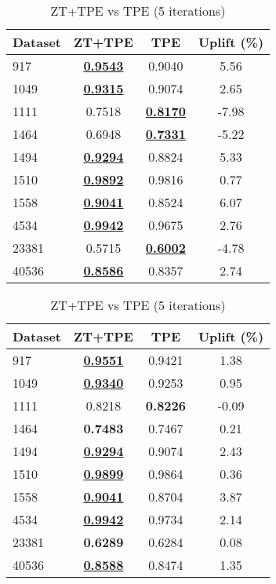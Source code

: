 \begin{table}[htbp]
\begin{center}
\begin{small}
\begin{sc}
\begin{subtable}[t]{0.48\textwidth}
    \centering
    \caption{ZT+TPE vs TPE (1 iteration)}
    \label{tab:randomforest-optuna-1}
    \begin{tabular}{lccc}
    \toprule
    \textbf{Dataset} & \textbf{ZT+TPE} & \textbf{TPE} & \textbf{Uplift (\%)} \\
    \midrule
    917    & \underline{\textbf{0.9543}} & 0.9040 & 5.56 \\
    1049    & \underline{\textbf{0.9315}} & 0.9074 & 2.65 \\
    1111    & 0.7518 & \underline{\textbf{0.8170}} & -7.98 \\
    1464    & 0.6948 & \underline{\textbf{0.7331}} & -5.22 \\
    1494    & \underline{\textbf{0.9294}} & 0.8824 & 5.33 \\
    1510    & \underline{\textbf{0.9892}} & 0.9816 & 0.77 \\
    1558    & \underline{\textbf{0.9041}} & 0.8524 & 6.07 \\
    4534    & \underline{\textbf{0.9942}} & 0.9675 & 2.76 \\
    23381    & 0.5715 & \underline{\textbf{0.6002}} & -4.78 \\
    40536    & \underline{\textbf{0.8586}} & 0.8357 & 2.74 \\
    \bottomrule
    \end{tabular}
\end{subtable}
\hfill
\begin{subtable}[t]{0.48\textwidth}
    \centering
    \caption{ZT+TPE vs TPE (5 iterations)}
    \label{tab:randomforest-optuna-5}
    \begin{tabular}{lccc}
    \toprule
    \textbf{Dataset} & \textbf{ZT+TPE} & \textbf{TPE} & \textbf{Uplift (\%)} \\
    \midrule
    917    & \underline{\textbf{0.9551}} & 0.9421 & 1.38 \\
    1049    & \underline{\textbf{0.9340}} & 0.9253 & 0.95 \\
    1111    & 0.8218 & \textbf{0.8226} & -0.09 \\
    1464    & \textbf{0.7483} & 0.7467 & 0.21 \\
    1494    & \underline{\textbf{0.9294}} & 0.9074 & 2.43 \\
    1510    & \underline{\textbf{0.9899}} & 0.9864 & 0.36 \\
    1558    & \underline{\textbf{0.9041}} & 0.8704 & 3.87 \\
    4534    & \underline{\textbf{0.9942}} & 0.9734 & 2.14 \\
    23381    & \textbf{0.6289} & 0.6284 & 0.08 \\
    40536    & \underline{\textbf{0.8588}} & 0.8474 & 1.35 \\
    \bottomrule
    \end{tabular}
\end{subtable}


\end{sc}
\end{small}
\end{center}
\end{table}
